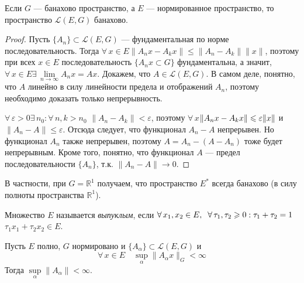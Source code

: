 \documentclass[10pt]{article}
\newcommand*{\p}[1]{#1\nobreak\discretionary{}{\hbox{$\mathsurround=0pt #1$}}{}}
\begin{document}
\begin{theorem}
Если $G$ --- банахово пространство, а $E$ --- нормированное
пространство, то пространство $\mathcal{L}(E,G)$ банахово.
\end{theorem}

\begin{proof}
Пусть $\{A_n\}\subset\mathcal{L}(E,G)$ --- фундаментальная по норме
последовательность. Тогда $\forall\,x\in
E$\;\;$\|A_nx-A_kx\|\leqslant \|A_n-A_k\|\|x\|$, поэтому при всех
$x\in E$ последовательность $\{A_nx\subset G\}$ фундаментальна, а
значит, $\forall\,x\in E$\;\;$\exists\,\lim\limits_{n\to\infty}
A_nx=Ax$. Докажем, что $A\in\mathcal{L}(E,G)$. В самом деле,
понятно, что $A$ линейно в силу линейности предела и отображений
$A_n$, поэтому необходимо доказать только непрерывность.

$\forall\,\varepsilon>0$\;\;$\exists\,n_0:\forall\,n,k>n_0$\;\;
$\|A_n-A_k\|<\varepsilon$, поэтому
$\forall\,x$\;\;$\|A_nx-A_kx\|\p\leqslant\varepsilon\|x\|$ и
$\|A_n-A\|\leqslant\varepsilon$. Отсюда следует, что функционал
$A_n-A$ непрерывен. Но функционал $A_n$ также непрерывен, поэтому
$A=A_n-(A-A_n)$ тоже будет непрерывным. Кроме того, понятно, что
функционал $A$ --- предел последовательности $\{A_n\}$, т.к.
$\|A_n-A\|\to 0$.
\end{proof}

В частности, при $G=\mathbb{R}^1$ получаем, что пространство $E^*$
всегда банахово (в силу полноты пространства $\mathbb{R}^1$).

\begin{df}
Множество $E$ называется \emph{выпуклым}, если
$\forall\,x_1,x_2\p\in
E,\;\;\forall\,\tau_1,\tau_2\geqslant0:\tau_1+\tau_2=1$\;\;$\tau_1x_1+\tau_2x_2\in
E$.
\end{df}

\begin{theorem}
Пусть $E$ полно, $G$ нормировано и
$\{A_\alpha\}\subset\mathcal{L}(E,G)$ и
$$\forall\,x\in E \quad \sup\limits_\alpha\|A_\alpha x\|_G<\infty$$
Тогда $\sup\limits_\alpha\|A_\alpha\|<\infty$.
\end{theorem}
\end{document}

